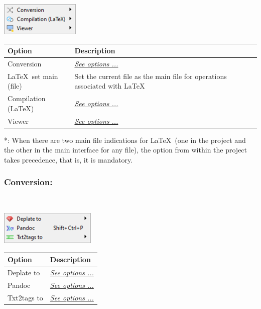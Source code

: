 \includegraphics[scale=0.50]{./res/menu_tools_processing.png}\\

\begin{scriptsize}
  \begin{tabularx}{\textwidth}{>{\hsize=0.3\hsize}X>{\hsize=0.7\hsize}X}\\
    \hline
    \textbf{Option} & \textbf{Description} \\
    \hline
    Conversion & \textit{\href{\#menu\_tools\_processing\_conversion}{See options ...}} \\
    \LaTeX ~set main (file) & Set the current file as the main file for operations associated with \LaTeX* \\
    Compilation (\LaTeX) & \textit{\href{\#menu\_tools\_processing\_conversion\_compilation}{See options ...}} \\
    Viewer & \textit{\href{\#menu\_tools\_processing\_viewer}{See options ...}} \\
    \hline
  \end{tabularx}
\end{scriptsize}
*: When there are two main file indications for \LaTeX ~(one in the project and the other in the main
interface for any file), the option from within the project takes precedence, that is, it is mandatory.

\newpage
\hypertarget{menu_tools_processing_conversion}{}
\subsubsection{Conversion:}\\

\includegraphics[scale=0.50]{./res/menu_tools_processing_conversion.png}\\

\begin{scriptsize}
  \begin{tabularx}{\textwidth}{>{\hsize=0.3\hsize}X>{\hsize=0.7\hsize}X}\\
    \hline
    \textbf{Option} & \textbf{Description} \\
    \hline
    Deplate to & \textit{\href{\#menu\_tools\_processing\_conversion\_deplate}{See options ...}} \\
    Pandoc & \textit{\href{\#menu\_tools\_processing\_conversion\_pandoc}{See options ...}} \\
    Txt2tags to & \textit{\href{\#menu\_tools\_processing\_conversion\_txt2tags}{See options ...}} \\
    \hline
  \end{tabularx}
\end{scriptsize}

